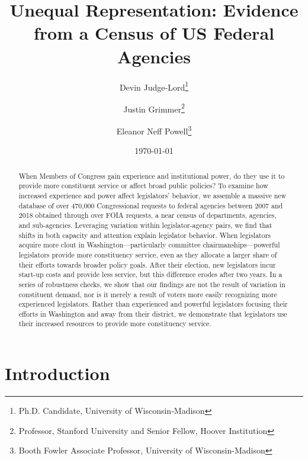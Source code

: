 \documentclass[12pt]{article}
\title{Unequal Representation: Evidence from a Census of US Federal Agencies}
\author{Devin Judge-Lord\thanks{Ph.D. Candidate, University of Wisconsin-Madison}\and Justin Grimmer\thanks{Professor, Stanford University and Senior Fellow, Hoover Institution} \and Eleanor Neff Powell\thanks{Booth Fowler Associate Professor, University of Wisconsin-Madison}}
\date{\today}
\begin{document}
\maketitle




\begin{abstract}
\noindent 
When Members of Congress gain experience and institutional power, do they use it to provide more constituent service or affect broad public policies? To examine how increased experience and power affect legislators' behavior, we assemble a massive new database of over 470,000 Congressional requests to federal agencies between 2007 and 2018 obtained through over  FOIA requests, a near census of departments, agencies, and sub-agencies. Leveraging variation within legislator-agency pairs, we find that shifts in both capacity and attention explain legislator behavior. When legislators acquire more clout in Washington---particularly committee chairmanships---powerful legislators provide more constituency service, even as they allocate a larger share of their efforts towards broader policy goals. After their election, new legislators incur start-up costs and provide less service, but this difference erodes after two years. In a series of robustness checks, we show that our findings are not the result of variation in constituent demand, nor is it merely a result of voters more easily recognizing more experienced legislators. Rather than experienced and powerful legislators focusing their efforts in Washington and away from their district, we demonstrate that legislators use their increased resources to provide more constituency service. 
\end{abstract}



%

%

\newpage
\doublespacing
\section{Introduction}
\end{document}
